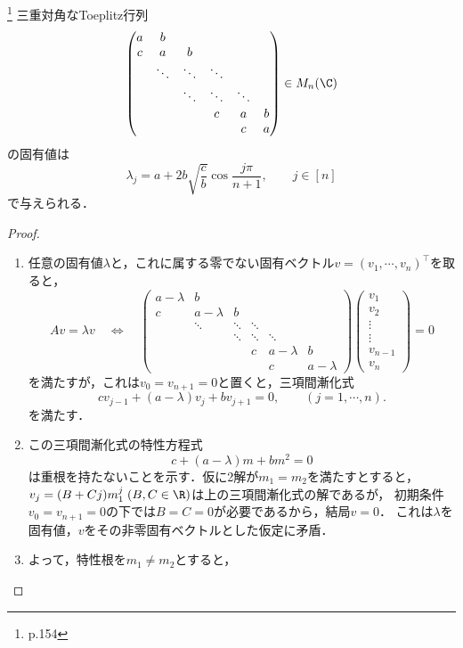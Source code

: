 \documentclass[uplatex,dvipdfmx]{jsarticle}
\begin{document}
\begin{lemma*}\footnote{\cite{Smith86-NumericalSolutionOfPDE} p.154}
    三重対角なToeplitz行列
    \[\begin{pmatrix}
        a&b\\
        c&a&b\\
        &\ddots&\ddots&\ddots\\
        &&\ddots&\ddots&\ddots\\
        &&&c&a&b\\
        &&&&c&a
    \end{pmatrix}\in M_n(\C)\]
    の固有値は
    \[\lambda_j=a+2b\sqrt{\frac{c}{b}}\cos\frac{j\pi}{n+1},\qquad j\in[n]\]
    で与えられる．
\end{lemma*}
\begin{proof}\mbox{}
    \begin{enumerate}[{Step}1]
        \item 任意の固有値$\lambda$と，これに属する零でない固有ベクトル$v=(v_1,\cdots,v_n)^\top$を取ると，
        \[Av=\lambda v\quad\Leftrightarrow\quad 
        \begin{pmatrix}
            a-\lambda&b\\
            c&a-\lambda&b\\
            &\ddots&\ddots&\ddots\\
            &&\ddots&\ddots&\ddots\\
            &&&c&a-\lambda&b\\
            &&&&c&a-\lambda
        \end{pmatrix}\begin{pmatrix}v_1\\v_2\\\vdots\\\vdots\\v_{n-1}\\v_n\end{pmatrix}=0\]
        を満たすが，これは$v_0=v_{n+1}=0$と置くと，三項間漸化式
        \[cv_{j-1}+(a-\lambda)v_j+bv_{j+1}=0,\qquad(j=1,\cdots,n).\]
        を満たす．
        \item この三項間漸化式の特性方程式
        \[c+(a-\lambda)m+bm^2=0\]
        は重根を持たないことを示す．仮に2解が$m_1=m_2$を満たすとすると，
        $v_j=(B+Cj)m_1^j\;(B,C\in\R)$は上の三項間漸化式の解であるが，
        初期条件$v_0=v_{n+1}=0$の下では$B=C=0$が必要であるから，結局$v=0$．
        これは$\lambda$を固有値，$v$をその非零固有ベクトルとした仮定に矛盾．
        \item よって，特性根を$m_1\ne m_2$とすると，

\end{enumerate}
\end{proof}
\end{document}
